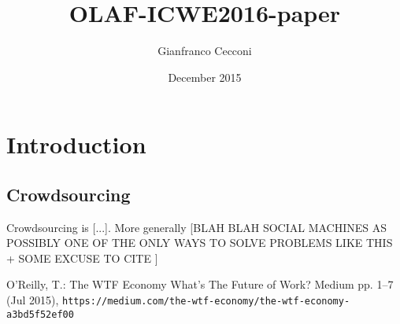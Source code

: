 \documentclass{llncs}
\title{OLAF-ICWE2016-paper}
\author{Gianfranco Cecconi}
\institute{University of Southampton \email{gc1a13@soton.ac.uk}}
\date{December 2015}
\begin{document}
\maketitle

\section{Introduction}

\subsection{Crowdsourcing}

Crowdsourcing is {[}...{]}. More generally {[}BLAH BLAH SOCIAL MACHINES AS POSSIBLY ONE OF THE ONLY WAYS TO SOLVE PROBLEMS LIKE THIS + SOME EXCUSE TO CITE \cite{OReilly:2015uo}{]}

\begin{thebibliography}{1}
\providecommand{\url}[1]{\texttt{#1}}
\providecommand{\urlprefix}{URL }

O'Reilly, T.: {The WTF Economy {\textemdash} What{\textquoteright}s The Future
  of Work? {\textemdash} Medium} pp. 1--7 (Jul 2015),
  \url{https://medium.com/the-wtf-economy/the-wtf-economy-a3bd5f52ef00}

\end{thebibliography}
\end{document}
